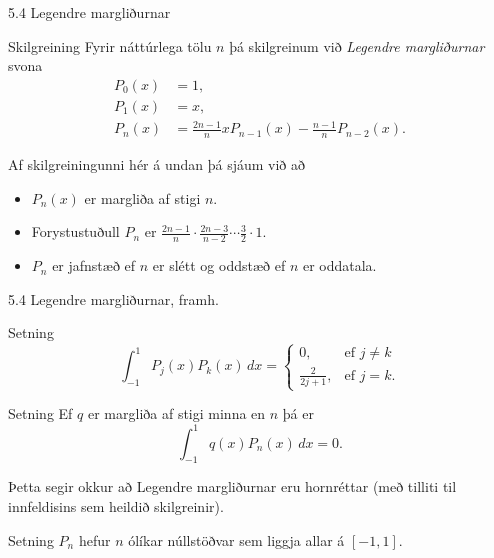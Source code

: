 \begin{frame}{5.4 Legendre margliðurnar}
 \begin{block}{Skilgreining}
  Fyrir náttúrlega tölu $n$ þá skilgreinum við \emph{Legendre margliðurnar} svona
  \begin{align*}
   P_0(x) &= 1,\\
   P_1(x) &= x,\\
   P_n(x) &= \frac{2n-1}n x P_{n-1}(x) - \frac{n-1}n P_{n-2}(x).
  \end{align*}

 \pause
 
 Af skilgreiningunni hér á undan þá sjáum við að \pause
  \begin{itemize}
   \item $P_n(x)$ er margliða af stigi $n$.\pause
   \item Forystustuðull $P_n$ er $\frac {2n-1}n \cdot \frac {2n-3}{n-2} \cdots \frac 32 \cdot 1$.\pause
   \item $P_n$ er jafnstæð ef $n$ er slétt og oddstæð ef $n$ er oddatala.
  \end{itemize}

 \end{block}
\end{frame}

\begin{frame}{5.4 Legendre margliðurnar, framh.}
 \begin{block}{Setning}
  $$
    \int_{-1}^1 P_j(x) P_k(x)\, dx =
    \begin{cases}
     0, & \text{ef } j\neq k\\
     \frac{2}{2j+1}, & \text{ef } j=k.
    \end{cases}
  $$
 \end{block}
 \pause
 \begin{block}{Setning}
  Ef $q$ er margliða af stigi minna en $n$ þá er 
  $$
   \int_{-1}^1 q(x)P_n(x)\, dx = 0.
  $$
 \end{block}
\pause
 Þetta segir okkur að Legendre margliðurnar eru hornréttar (með tilliti til innfeldisins sem
 heildið skilgreinir).
 
 \begin{block}{Setning}
  $P_n$ hefur $n$ ólíkar núllstöðvar sem liggja allar á $[-1,1]$.
 \end{block}
  \end{frame}

